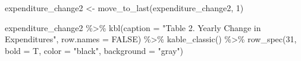 \documentclass[
  letterpaper,
  DIV=11,
  numbers=noendperiod]{scrreport}
\newenvironment{Shaded}{\begin{snugshade}}{\end{snugshade}}
\newcommand{\AttributeTok}[1]{\textcolor[rgb]{0.40,0.45,0.13}{#1}}
\newcommand{\ConstantTok}[1]{\textcolor[rgb]{0.56,0.35,0.01}{#1}}
\newcommand{\DecValTok}[1]{\textcolor[rgb]{0.68,0.00,0.00}{#1}}
\newcommand{\FunctionTok}[1]{\textcolor[rgb]{0.28,0.35,0.67}{#1}}
\newcommand{\NormalTok}[1]{\textcolor[rgb]{0.00,0.23,0.31}{#1}}
\newcommand{\OtherTok}[1]{\textcolor[rgb]{0.00,0.23,0.31}{#1}}
\newcommand{\SpecialCharTok}[1]{\textcolor[rgb]{0.37,0.37,0.37}{#1}}
\newcommand{\StringTok}[1]{\textcolor[rgb]{0.13,0.47,0.30}{#1}}
\begin{document}
\begin{Shaded}
\begin{Highlighting}[]
\NormalTok{expenditure\_change2 }\OtherTok{\textless{}{-}} \FunctionTok{move\_to\_last}\NormalTok{(expenditure\_change2, }\DecValTok{1}\NormalTok{)}

\NormalTok{expenditure\_change2 }\SpecialCharTok{\%\textgreater{}\%} 
  \FunctionTok{kbl}\NormalTok{(}\AttributeTok{caption =} \StringTok{"Table 2. Yearly Change in Expenditures"}\NormalTok{, }\AttributeTok{row.names =} \ConstantTok{FALSE}\NormalTok{) }\SpecialCharTok{\%\textgreater{}\%} 
  \FunctionTok{kable\_classic}\NormalTok{() }\SpecialCharTok{\%\textgreater{}\%}
    \FunctionTok{row\_spec}\NormalTok{(}\DecValTok{31}\NormalTok{, }\AttributeTok{bold =}\NormalTok{ T, }\AttributeTok{color =} \StringTok{"black"}\NormalTok{, }\AttributeTok{background =} \StringTok{"gray"}\NormalTok{)}
\end{Highlighting}
\end{Shaded}
\end{document}
